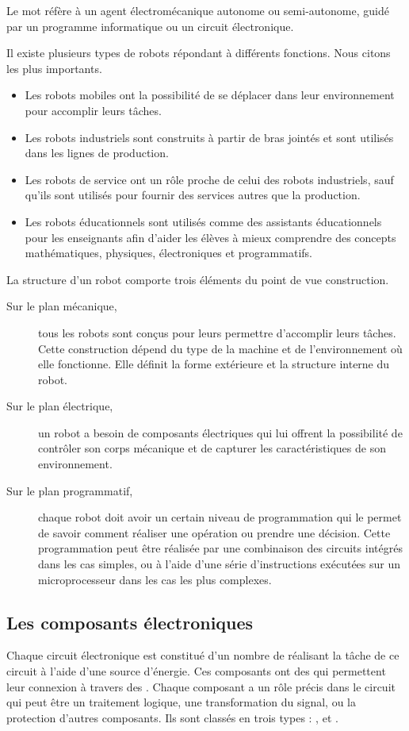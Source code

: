 Le mot  réfère à un agent électromécanique autonome ou
semi-autonome, guidé par un programme informatique ou un circuit électronique.

Il existe plusieurs types de robots répondant à différents fonctions. Nous
citons les plus importants.

\begin{itemize}
  \item Les robots mobiles ont la possibilité de se déplacer dans leur
  environnement pour accomplir leurs tâches.
  \item Les robots industriels sont construits à partir de bras jointés et
  sont utilisés dans les lignes de production.
  \item Les robots de service ont un rôle proche de celui des robots
  industriels, sauf qu'ils sont utilisés pour fournir des services autres que
  la production.
  \item Les robots éducationnels sont utilisés comme des assistants
  éducationnels pour les enseignants afin d'aider les élèves à mieux comprendre
  des concepts mathématiques, physiques, électroniques et programmatifs.
\end{itemize}

La structure d'un robot comporte trois éléments du point de vue construction.

\begin{description}
  \item[Sur le plan mécanique,] tous les robots sont conçus pour leurs
  permettre d'accomplir leurs tâches. Cette construction dépend du type de la
  machine et de l'environnement où elle fonctionne. Elle définit la forme
  extérieure et la structure interne du robot.
  \item[Sur le plan électrique,] un robot a besoin de composants
  électriques qui lui offrent la possibilité de
  contrôler son corps mécanique et de capturer les caractéristiques de son
  environnement.
  \item[Sur le plan programmatif,] chaque robot doit avoir un certain
  niveau de programmation qui le permet de
  savoir comment réaliser une opération ou prendre une décision. Cette
  programmation peut être réalisée par une combinaison des circuits intégrés dans
  les cas simples, ou à l'aide d'une série d'instructions exécutées sur un
  microprocesseur dans les cas les plus complexes.~\cite{wikipediaRobotics}
\end{description}

\subsection{Les composants électroniques}
Chaque circuit électronique est constitué d'un nombre de 
réalisant la tâche de ce circuit à l'aide d'une source d'énergie. Ces composants
ont des  qui permettent leur connexion à travers des
. Chaque composant a un rôle précis dans le circuit qui peut être
un traitement logique, une transformation du signal, ou la protection d'autres
composants. Ils sont classés en trois types : ,
 et .~\cite{wikipediaElectronicComponent}

